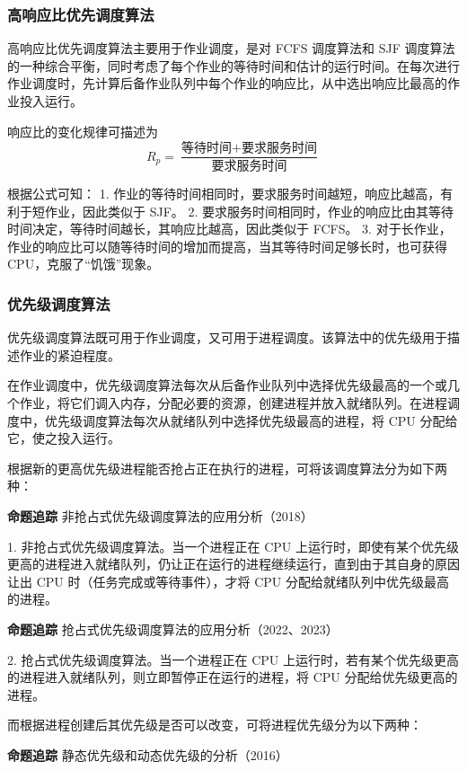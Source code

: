 \documentclass{ctexbook}
\begin{document}
	\subsubsection{高响应比优先调度算法}
	
	高响应比优先调度算法主要用于作业调度，是对 FCFS 调度算法和 SJF 调度算法的一种综合平衡，同时考虑了每个作业的等待时间和估计的运行时间。在每次进行作业调度时，先计算后备作业队列中每个作业的响应比，从中选出响应比最高的作业投入运行。
	
	响应比的变化规律可描述为
	\[
	R_{p} = \frac{\text{等待时间} + \text{要求服务时间}}{\text{要求服务时间}}
	\]
	
	根据公式可知：
	1. 作业的等待时间相同时，要求服务时间越短，响应比越高，有利于短作业，因此类似于 SJF。
	2. 要求服务时间相同时，作业的响应比由其等待时间决定，等待时间越长，其响应比越高，因此类似于 FCFS。
	3. 对于长作业，作业的响应比可以随等待时间的增加而提高，当其等待时间足够长时，也可获得 CPU，克服了“饥饿”现象。
	
	\subsubsection{优先级调度算法}
	
	优先级调度算法既可用于作业调度，又可用于进程调度。该算法中的优先级用于描述作业的紧迫程度。
	
	在作业调度中，优先级调度算法每次从后备作业队列中选择优先级最高的一个或几个作业，将它们调入内存，分配必要的资源，创建进程并放入就绪队列。在进程调度中，优先级调度算法每次从就绪队列中选择优先级最高的进程，将 CPU 分配给它，使之投入运行。
	
	根据新的更高优先级进程能否抢占正在执行的进程，可将该调度算法分为如下两种：
	
	\textbf{命题追踪} 非抢占式优先级调度算法的应用分析（2018）
	
	1. 非抢占式优先级调度算法。当一个进程正在 CPU 上运行时，即使有某个优先级更高的进程进入就绪队列，仍让正在运行的进程继续运行，直到由于其自身的原因让出 CPU 时（任务完成或等待事件），才将 CPU 分配给就绪队列中优先级最高的进程。
	
	\textbf{命题追踪} 抢占式优先级调度算法的应用分析（2022、2023）
	
	2. 抢占式优先级调度算法。当一个进程正在 CPU 上运行时，若有某个优先级更高的进程进入就绪队列，则立即暂停正在运行的进程，将 CPU 分配给优先级更高的进程。
	
	而根据进程创建后其优先级是否可以改变，可将进程优先级分为以下两种：
	
	\textbf{命题追踪} 静态优先级和动态优先级的分析（2016）
	
\end{document}
